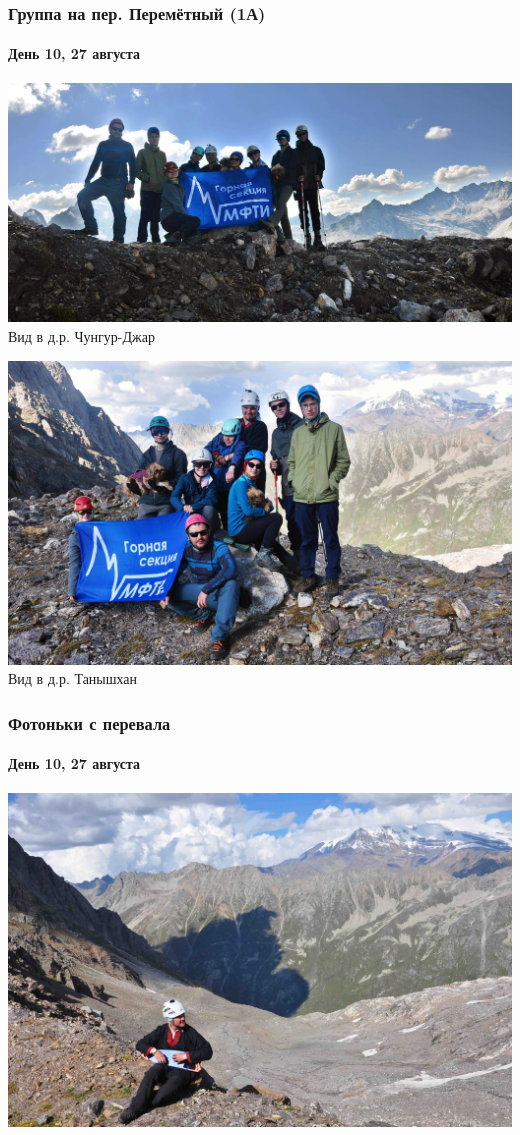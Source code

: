\begin{frame}
	\frametitle{Группа на пер. Перемётный (1А)}
	\framesubtitle{День 10, 27 августа}
	{\tiny
		\begin{minipage}{\fourpicsize}
			\centering
			\includegraphics[width=\textwidth]{../pics/DSC_0412 2.jpg}			
			Вид в д.р. Чунгур-Джар
		\end{minipage}
		\hfill
		\begin{minipage}{\fourpicsize}
			\centering
			\includegraphics[width=\textwidth]{../pics/DSC_0419 2.jpg}			
			Вид в д.р. Танышхан
		\end{minipage}
		\vfill
	}
\end{frame}

\begin{frame}
	\frametitle{Фотоньки с перевала}
	\framesubtitle{День 10, 27 августа}
	\centering
	\includegraphics[width=\textwidth]{../pics/DSC_0369 2}			
\end{frame}

